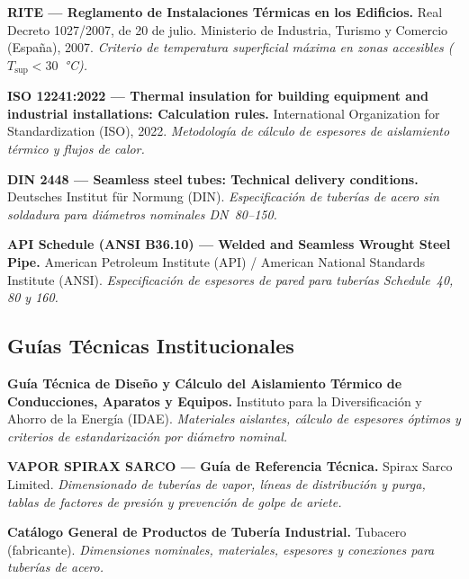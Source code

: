 \begin{enumerate}[label={[\arabic*]}, leftmargin=2em]
	\item \textbf{RITE --- Reglamento de Instalaciones Térmicas en los Edificios.}
	      Real Decreto 1027/2007, de 20 de julio.
	      Ministerio de Industria, Turismo y Comercio (España), 2007.
	      \textit{Criterio de temperatura superficial máxima en zonas accesibles ($T_{\text{sup}} < 30$~°C).}

	\item \textbf{ISO 12241:2022 --- Thermal insulation for building equipment and industrial installations: Calculation rules.}
	      International Organization for Standardization (ISO), 2022.
	      \textit{Metodología de cálculo de espesores de aislamiento térmico y flujos de calor.}

	\item \textbf{DIN 2448 --- Seamless steel tubes: Technical delivery conditions.}
	      Deutsches Institut für Normung (DIN).
	      \textit{Especificación de tuberías de acero sin soldadura para diámetros nominales DN~80--150.}

	\item \textbf{API Schedule (ANSI B36.10) --- Welded and Seamless Wrought Steel Pipe.}
	      American Petroleum Institute (API) / American National Standards Institute (ANSI).
	      \textit{Especificación de espesores de pared para tuberías Schedule~40, 80 y 160.}
\end{enumerate}

\subsection*{Guías Técnicas Institucionales}

\begin{enumerate}[label={[\arabic*]}, leftmargin=2em, resume]
	\item \textbf{Guía Técnica de Diseño y Cálculo del Aislamiento Térmico de Conducciones, Aparatos y Equipos.}
	      Instituto para la Diversificación y Ahorro de la Energía (IDAE).
	      \textit{Materiales aislantes, cálculo de espesores óptimos y criterios de estandarización por diámetro nominal.}

	\item \textbf{VAPOR SPIRAX SARCO --- Guía de Referencia Técnica.}
	      Spirax Sarco Limited.
	      \textit{Dimensionado de tuberías de vapor, líneas de distribución y purga, tablas de factores de presión y prevención de golpe de ariete.}

	\item \textbf{Catálogo General de Productos de Tubería Industrial.}
	      Tubacero (fabricante).
	      \textit{Dimensiones nominales, materiales, espesores y conexiones para tuberías de acero.}
\end{enumerate}

